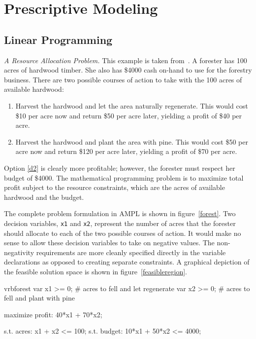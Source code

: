 \chapter{Prescriptive Modeling}
\section{Linear Programming}

\emph{A Resource Allocation Problem.} This example is taken 
from~\cite{chvatal:1983}.  A forester has 100
acres of hardwood timber. She also has \$4000 cash on-hand to use for
the forestry business. There are two possible courses of action to 
take with the 100 acres of available hardwood:
\begin{enumerate}
\item Harvest the hardwood and let the area naturally regenerate. This
  would cost \$10 per acre now and return \$50 per acre later,
  yielding a profit of \$40 per acre.
\item Harvest the hardwood and plant the area with pine. This would
  cost \$50 per acre now and return \$120 per acre later, yielding a
  profit of \$70 per acre. \label{d2}
\end{enumerate}
Option \ref{d2} is clearly more profitable; however, the forester must
respect her budget of \$4000. The mathematical programming problem is
to maximize total profit subject to the resource constraints, which
are the acres of available hardwood and the budget.

The complete problem formulation in AMPL is shown in
figure~\ref{forest}.  Two decision variables, \texttt{x1} and
\texttt{x2}, represent the number of acres that the forester should
allocate to each of the two possible courses of action.  It would make
no sense to allow these decision variables to take on negative
values. The non-negativity requirements are more cleanly specified
directly in the variable declarations as opposed to creating separate
constraints. A graphical depiction of the feasible solution space is
shown in figure~\ref{feasibleregion}.

\begin{SaveVerbatim}{vrbforest}
var x1 >= 0;  # acres to fell and let regenerate
var x2 >= 0;  # acres to fell and plant with pine

maximize profit: 40*x1 + 70*x2;

s.t. acres: x1 + x2 <= 100;
s.t. budget: 10*x1 + 50*x2 <= 4000;
\end{SaveVerbatim}

